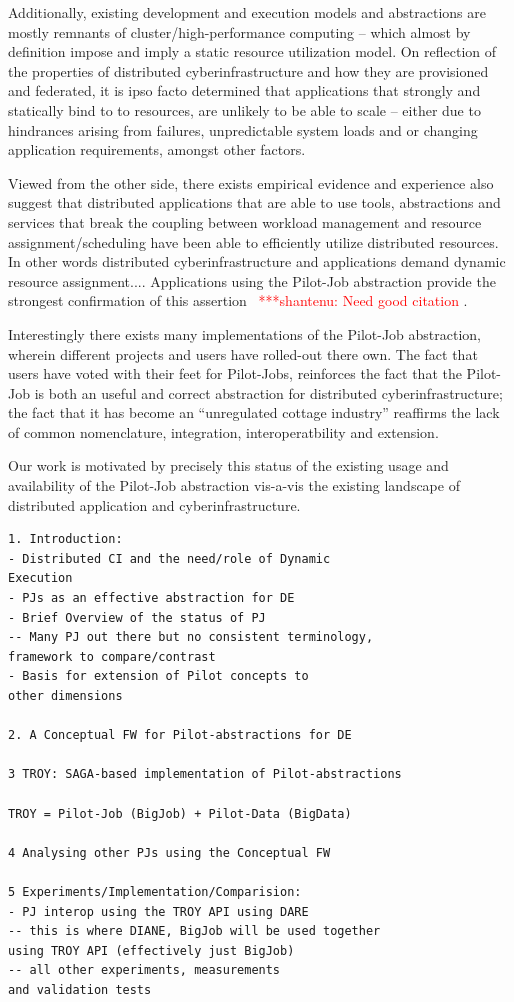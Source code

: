 \documentclass[conference,final]{IEEEtran}
\newcommand{\jhanote}[1]{ {\textcolor{red} { ***shantenu: #1 }}}
\newcommand{\jhanote}[1]{}
\begin{document}
Additionally, existing development and execution models and
abstractions are mostly remnants of cluster/high-performance computing
-- which almost by definition impose and imply a static resource
utilization model.  On reflection of the properties of distributed
cyberinfrastructure and how they are provisioned and federated, it is
ipso facto determined that applications that strongly and statically
bind to to resources, are unlikely to be able to scale -- either due
to hindrances arising from failures, unpredictable system loads and or
changing application requirements, amongst other factors.

Viewed from the other side, there exists empirical evidence and
experience also suggest that distributed applications that are able to
use tools, abstractions and services that break the coupling between
workload management and resource assignment/scheduling have been able
to efficiently utilize distributed resources.  In other words
distributed cyberinfrastructure and applications demand dynamic
resource assignment.... Applications using the Pilot-Job abstraction
provide the strongest confirmation of this assertion~\cite{}
\jhanote{Need good citation}.

Interestingly there exists many implementations of the Pilot-Job
abstraction, wherein different projects and users have rolled-out
there own. The fact that users have voted with their feet for
Pilot-Jobs, reinforces the fact that the Pilot-Job is both an useful
and correct abstraction for distributed cyberinfrastructure; the fact
that it has become an ``unregulated cottage industry'' reaffirms the
lack of common nomenclature, integration, interoperatbility and
extension.

Our work is motivated by precisely this status of the existing usage
and availability of the Pilot-Job abstraction vis-a-vis the existing
landscape of distributed application and cyberinfrastructure.

\begin{footnotesize}
\begin{verbatim}
1. Introduction:
- Distributed CI and the need/role of Dynamic 
Execution 
- PJs as an effective abstraction for DE
- Brief Overview of the status of PJ
-- Many PJ out there but no consistent terminology, 
framework to compare/contrast
- Basis for extension of Pilot concepts to 
other dimensions
 
2. A Conceptual FW for Pilot-abstractions for DE

3 TROY: SAGA-based implementation of Pilot-abstractions

TROY = Pilot-Job (BigJob) + Pilot-Data (BigData)

4 Analysing other PJs using the Conceptual FW

5 Experiments/Implementation/Comparision:
- PJ interop using the TROY API using DARE
-- this is where DIANE, BigJob will be used together
using TROY API (effectively just BigJob)
-- all other experiments, measurements 
and validation tests

\end{verbatim}
\end{footnotesize}
\end{document}

